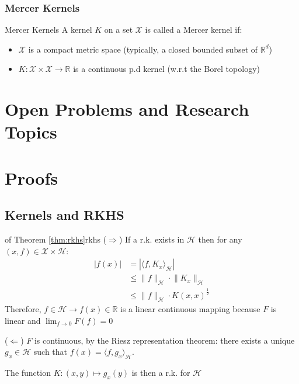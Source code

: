 \documentclass{article}
\begin{document}
\subsubsection{Mercer Kernels}

\begin{Definition}{Mercer Kernels}{}
  A kernel $K$ on a set $\mathcal{X}$ is called a Mercer kernel if: 
  \begin{itemize}
    \item $\mathcal{X}$ is a compact metric space (typically, a closed bounded
    subset of $\mathbb{R}^d$)
    \item $K: \mathcal{X}\times\mathcal{X} \rightarrow \mathbb{R}$ is a
    continuous p.d kernel (w.r.t the Borel topology)
  \end{itemize}
\end{Definition}

\section{Open Problems and Research Topics}



\appendix

\section{Proofs}

\subsection{Kernels and RKHS}

\begin{Proof}{of Theorem \ref{thm:rkhs}}{rkhs}
  ($\Rightarrow$) If a r.k. exists in $\mathcal{H}$ then for any $(x,f) \in 
  \mathcal{X} \times \mathcal{H}$:
  \begin{align*}
    |f(x)| &= |\langle f, K_x \rangle_\mathcal{H} |\\
           &\leq \lVert f \rVert_\mathcal{H} \cdot \lVert K_x \rVert_\mathcal{H}
           \tag{Cauchy-Schwarz}\\
           &\leq \lVert f \rVert_\mathcal{H} \cdot K(x,x)^\frac{1}{2}
  \end{align*}
  Therefore, $f\in\mathcal{H} \rightarrow f(x) \in \mathbb{R}$ is a linear 
  continuous mapping because $F$ is linear and $\lim_{f\rightarrow 0} F(f)= 0$

  \vspace{10pt}
  ($\Leftarrow$) $F$ is continuous, by the Riesz representation theorem: there
  exists a unique $g_x \in \mathcal{H}$ such that $f(x) = \langle f, g_x 
  \rangle_\mathcal{H}$.

  The function $K: (x, y) \mapsto g_x(y)$ is then a r.k. for $\mathcal{H}$
\end{Proof}
\end{document}
